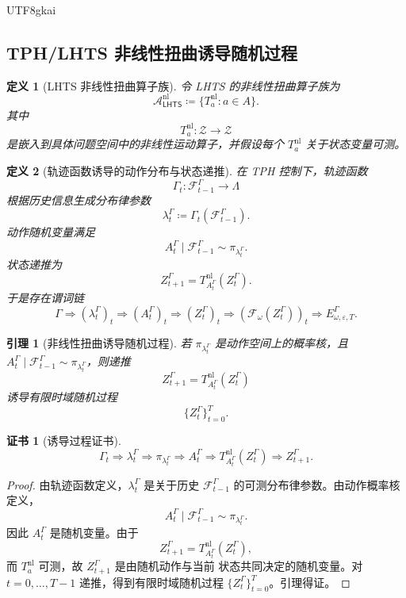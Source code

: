 \documentclass[12pt]{article}
\newtheorem{definition}{定义}[section]
\newtheorem{lemma}{引理}[section]
\newtheorem{Certificate}{证书}[section]
\newcommand{\LHTS}{\ensuremath{\mathsf{LHTS}}}
\newcommand{\DefEq}{\coloneqq}
\newcommand{\Fil}{\mathcal F}
\begin{document}
\begin{CJK*}{UTF8}{gkai}
\subsection{TPH/LHTS 非线性扭曲诱导随机过程}
\label{subsec:nonlinear-twist-induced-process}

\begin{definition}[LHTS 非线性扭曲算子族]
令 LHTS 的非线性扭曲算子族为
\[
\mathcal A_{\LHTS}^{\mathrm{nl}}
\DefEq
\{T_a^{\mathrm{nl}}:a\in A\}.
\]
其中
\[
T_a^{\mathrm{nl}}:\mathcal Z\to\mathcal Z
\]
是嵌入到具体问题空间中的非线性运动算子，并假设每个
\(T_a^{\mathrm{nl}}\) 关于状态变量可测。
\end{definition}

\begin{definition}[轨迹函数诱导的动作分布与状态递推]
在 TPH 控制下，轨迹函数
\[
\Gamma_t:\Fil_{t-1}^{\Gamma}\to\Lambda
\]
根据历史信息生成分布律参数
\[
\lambda_t^\Gamma
\DefEq
\Gamma_t(\Fil_{t-1}^{\Gamma}).
\]
动作随机变量满足
\[
A_t^\Gamma\mid\Fil_{t-1}^{\Gamma}
\sim
\pi_{\lambda_t^\Gamma}.
\]
状态递推为
\[
\boxed{
Z_{t+1}^{\Gamma}
=
T_{A_t^\Gamma}^{\mathrm{nl}}(Z_t^\Gamma).
}
\]
于是存在谓词链
\[
\boxed{
\Gamma
\Longrightarrow
(\lambda_t^\Gamma)_t
\Longrightarrow
(A_t^\Gamma)_t
\Longrightarrow
(Z_t^\Gamma)_t
\Longrightarrow
(\mathcal F_\omega(Z_t^\Gamma))_t
\Longrightarrow
E_{\omega,\varepsilon,T}^{\Gamma}.
}
\]
\end{definition}

\begin{lemma}[非线性扭曲诱导随机过程]
若 \(\pi_{\lambda_t^\Gamma}\) 是动作空间上的概率核，且
\(A_t^\Gamma\mid\Fil_{t-1}^{\Gamma}\sim\pi_{\lambda_t^\Gamma}\)，则递推
\[
Z_{t+1}^{\Gamma}
=
T_{A_t^\Gamma}^{\mathrm{nl}}(Z_t^\Gamma)
\]
诱导有限时域随机过程
\[
\{Z_t^\Gamma\}_{t=0}^{T}.
\]
\end{lemma}

\begin{Certificate}[诱导过程证书]
\[
\boxed{
\Gamma_t
\Rightarrow
\lambda_t^\Gamma
\Rightarrow
\pi_{\lambda_t^\Gamma}
\Rightarrow
A_t^\Gamma
\Rightarrow
T_{A_t^\Gamma}^{\mathrm{nl}}(Z_t^\Gamma)
\Rightarrow
Z_{t+1}^{\Gamma}.
}
\]
\end{Certificate}

\begin{proof}
由轨迹函数定义，\(\lambda_t^\Gamma\) 是关于历史
\(\Fil_{t-1}^{\Gamma}\) 的可测分布律参数。由动作概率核定义，
\[
A_t^\Gamma\mid\Fil_{t-1}^{\Gamma}\sim\pi_{\lambda_t^\Gamma}.
\]
因此 \(A_t^\Gamma\) 是随机变量。由于
\[
Z_{t+1}^{\Gamma}
=
T_{A_t^\Gamma}^{\mathrm{nl}}(Z_t^\Gamma),
\]
而 \(T_a^{\mathrm{nl}}\) 可测，故 \(Z_{t+1}^{\Gamma}\) 是由随机动作与当前
状态共同决定的随机变量。对 \(t=0,\ldots,T-1\) 递推，得到有限时域随机过程
\(\{Z_t^\Gamma\}_{t=0}^{T}\)。引理得证。
\end{proof}


\end{CJK*}
\end{document}

